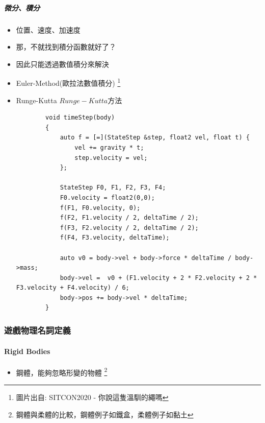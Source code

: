 \subparagraph{微分、積分}
\begin{itemize}
    \item{位置、速度、加速度}
    \item{那，不就找到積分函數就好了？}
    \item{因此只能透過數值積分來解決}
    \item{Euler-Method(歐拉法數值積分)}
    \footnote{圖片出自: SITCON2020 - 你說這隻溫馴的繩嗎}
    \item{Runge-Kutta \(Runge-Kutta方法\)}

    \begin{lstlisting}
        void timeStep(body) 
        {
            auto f = [=](StateStep &step, float2 vel, float t) {
                vel += gravity * t;
                step.velocity = vel;
            };
        
            StateStep F0, F1, F2, F3, F4;
            F0.velocity = float2(0,0);
            f(F1, F0.velocity, 0);
            f(F2, F1.velocity / 2, deltaTime / 2);
            f(F3, F2.velocity / 2, deltaTime / 2);
            f(F4, F3.velocity, deltaTime);
        
            auto v0 = body->vel + body->force * deltaTime / body->mass;
            body->vel =  v0 + (F1.velocity + 2 * F2.velocity + 2 * F3.velocity + F4.velocity) / 6;
            body->pos += body->vel * deltaTime;
        }
    \end{lstlisting}
\end{itemize}

\subsubsection{遊戲物理名詞定義}

\paragraph{Rigid Bodies}
\begin{itemize}
    \item{鋼體，能夠忽略形變的物體}
    \footnote{鋼體與柔體的比較，鋼體例子如鐵盒，柔體例子如黏土}   
\end{itemize}

